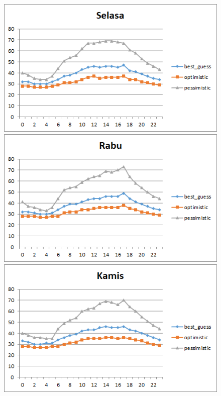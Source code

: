 \begin{figure}[H]
				\centering		
				\includegraphics[]{Gambar/selasasampel124072017reverse.png}
				\includegraphics[]{Gambar/rabusampel124072017reverse.png}
				\includegraphics[]{Gambar/kamissampel124072017reverse.png}
\end{figure}			
			
